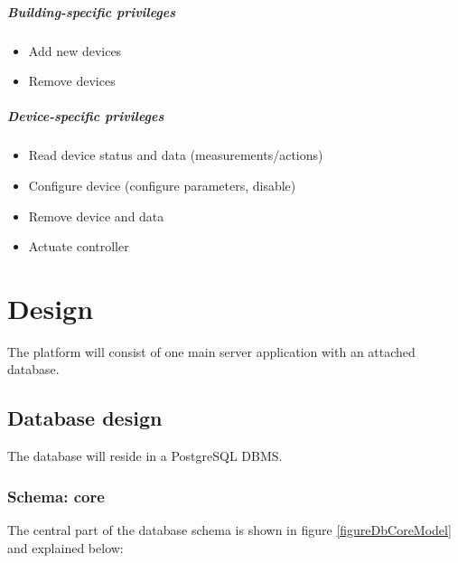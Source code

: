 \documentclass{report}
\begin{document}
\paragraph{Building-specific privileges}
\begin{itemize}
    \item{Add new devices}
    \item{Remove devices}
\end{itemize}

\paragraph{Device-specific privileges}
\begin{itemize}
    \item{Read device status and data (measurements/actions)}
    \item{Configure device (configure parameters, disable)}
    \item{Remove device and data}
    \item{Actuate controller}
\end{itemize}

\chapter{Design}
The platform will consist of one main server application with an attached database. 

\section{Database design}
The database will reside in a PostgreSQL DBMS. 

\subsection{Schema: core}
The central part of the database schema is shown in figure \ref{figureDbCoreModel} and explained below:
\end{document}

